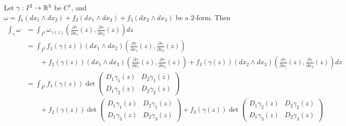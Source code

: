 \documentclass[11pt]{article}
\begin{document}
\begin{definition} Let $\gamma : I^2 \to \mathbb{R}^3$ be $C^1$, and $\omega = f_1 (dx_1 \wedge dx_2) + f_2 (dx_1 \wedge dx_3) + f_3 (dx_2 \wedge dx_3)$ be a $2$-form. Then \begin{align*} \int_{\gamma} \omega & = \int_{I^2} \omega_{\gamma(z)} \left( \frac{\partial \gamma}{\partial x_1}(z), \frac{\partial \gamma}{\partial x_2} (z) \right) dz \\ & = \int_{I^2}  f_1(\gamma (z)) (dx_1 \wedge dx_2) \left( \frac{\partial \gamma}{\partial x_1}(z), \frac{\partial \gamma}{\partial x_2} (z) \right) \\ & \qquad + f_2(\gamma(z))(dx_1 \wedge dx_3) \left( \frac{\partial \gamma}{\partial x_1}(z), \frac{\partial \gamma}{\partial x_2} (z) \right) + f_3 (\gamma (z)) (dx_2 \wedge dx_3) \left( \frac{\partial \gamma}{\partial x_1}(z), \frac{\partial \gamma}{\partial x_2} (z) \right) dz \\ & = \int_{I^2} f_1(\gamma(z)) \det \begin{pmatrix} D_1\gamma_1(z) & D_2 \gamma_1 (z) \\ D_1 \gamma_2(z) & D_2 \gamma_2(z) \end{pmatrix}\\ & \qquad +  f_2 (\gamma(z)) \det \begin{pmatrix} D_1\gamma_1(z) & D_2 \gamma_1 (z) \\ D_1 \gamma_3(z) & D_2 \gamma_3(z) \end{pmatrix} +  f_3(\gamma(z)) \det \begin{pmatrix} D_1\gamma_2(z) & D_2 \gamma_2 (z) \\ D_1 \gamma_3(z) & D_2 \gamma_3(z) \end{pmatrix} \end{align*}
\end{definition}
\end{document}
